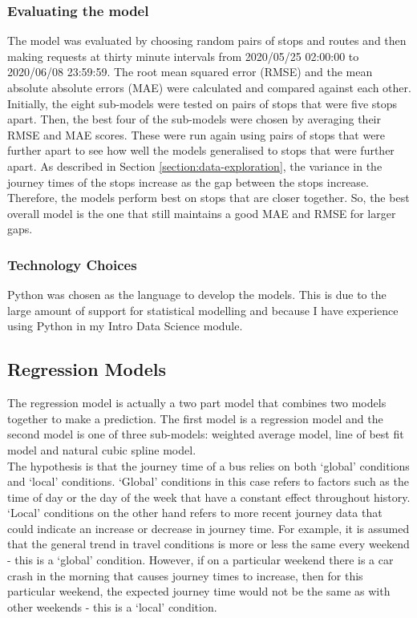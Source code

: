 \subsubsection{Evaluating the model}

The model was evaluated by choosing random pairs of stops and routes and then making requests at thirty minute intervals from 2020/05/25 02:00:00 to 2020/06/08 23:59:59. The root mean squared error (RMSE) and the mean absolute absolute errors (MAE) were calculated and compared against each other. \\

Initially, the eight sub-models were tested on pairs of stops that were five stops apart. Then, the best four of the sub-models were chosen by averaging their RMSE and MAE scores. These were run again using pairs of stops that were further apart to see how well the models generalised to stops that were further apart. As described in Section \ref{section:data-exploration}, the variance in the journey times of the stops increase as the gap between the stops increase. Therefore, the models perform best on stops that are closer together. So, the best overall model is the one that still maintains a good MAE and RMSE for larger gaps.

\subsubsection{Technology Choices}

Python was chosen as the language to develop the models. This is due to the large amount of support for statistical modelling and because I have experience using Python in my Intro Data Science module.

\subsection{Regression Models}

The regression model is actually a two part model that combines two models together to make a prediction. The first model is a regression model and the second model is one of three sub-models: weighted average model, line of best fit model and natural cubic spline model. \\

The hypothesis is that the journey time of a bus relies on both `global' conditions and `local' conditions. `Global' conditions in this case refers to factors such as the time of day or the day of the week that have a constant effect throughout history. `Local' conditions on the other hand refers to more recent journey data that could indicate an increase or decrease in journey time. For example, it is assumed that the general trend in travel conditions is more or less the same every weekend - this is a `global' condition. However, if on a particular weekend there is a car crash in the morning that causes journey times to increase, then for this particular weekend, the expected journey time would not be the same as with other weekends - this is a `local' condition. \\ 

